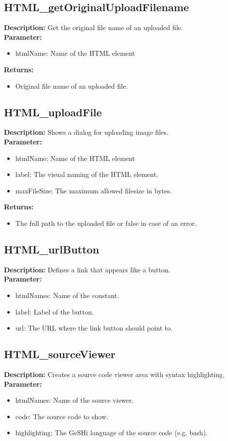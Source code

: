 \subsection{HTML\_getOriginalUploadFilename}
\textbf{Description:} Get the original file name of an uploaded file.\\
\textbf{Parameter:}
\begin{itemize}
\item htmlName: Name of the HTML element
\end{itemize}
\textbf{Returns:}
\begin{itemize}
\item Original file name of an uploaded file.
\end{itemize}

\subsection{HTML\_uploadFile}
\textbf{Description:} Shows a dialog for uploading image files.\\
\textbf{Parameter:}
\begin{itemize}
\item htmlName: Name of the HTML element
\item label: The visual naming of the HTML element.
\item maxFileSize: The maximum allowed filesize in bytes.
\end{itemize}
\textbf{Returns:}
\begin{itemize}
\item The full path to the uploaded file or false in case of an error.
\end{itemize}

\subsection{HTML\_urlButton}
\textbf{Description:} Defines a link that appears like a button.\\
\textbf{Parameter:}
\begin{itemize}
\item htmlNames: Name of the constant.
\item label: Label of the button.
\item url: The URL where the link button should point to.
\end{itemize}

\subsection{HTML\_sourceViewer}
\textbf{Description:} Creates a source code viewer area with syntax highlighting.\\
\textbf{Parameter:}
\begin{itemize}
\item htmlNames: Name of the source viewer.
\item code: The source code to show.
\item highlighting: The GeSHi language of the source code (e.g. bash).
\end{itemize}


